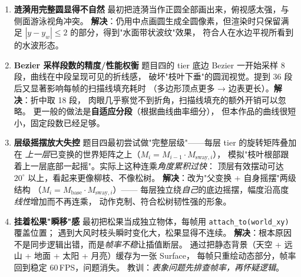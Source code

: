\documentclass[12pt, a4paper]{article}
\begin{document}
\begin{enumerate}[label=（\arabic*）, leftmargin=*]
    \item \textbf{涟漪用完整圆显得不自然}\quad
    最初把涟漪当作正圆全部画出来，俯视感太强，与侧面游泳视角冲突。
    \textbf{解决}：仍用中点画圆生成全圆像素，但渲染时只保留满足
    $|y - y_w| \le 2$ 的部分，得到"水面带状波纹"效果，
    符合人在水边平视所看到的水波形态。

    \item \textbf{Bezier 采样段数的精度/性能权衡}\quad
    题目四的 tier 底边 Bezier 一开始采样 8 段，曲线在中段呈现可见的折线感，
    破坏"枝叶下垂"的圆润视觉。提到 36 段后又显著影响每帧的扫描线填充耗时
    （多边形顶点更多 → 边表更长）。\textbf{解决}：折中取 18 段，
    肉眼几乎察觉不到折角，扫描线填充的额外开销可以忽略。
    更一般的做法是\textbf{自适应分段}（根据曲线曲率细分），
    但本作品的曲线很短小，固定段数已经足够。

    \item \textbf{层级摇摆放大失控}\quad
    题目四最初尝试做"完整层级"——每层 tier 的旋转矩阵叠加在
    \textit{上一层}已变换的世界矩阵之上（$M_i = M_{i-1} \cdot M_{\text{sway},i}$），
    模拟"枝叶根部跟着上一层底部一起摇"。实际上这种连乘\textit{角度累积过快}：
    顶层有效摆动可达 $20^\circ$ 以上，看起来更像柳枝、不像松树。
    \textbf{解决}：改为"父变换 + 自身摇摆"两级结构
    （$M_i = M_{\text{base}} \cdot M_{\text{sway},i}$）——
    每层独立绕\textit{自己}的底边摇摆，幅度沿高度\textit{线性}增加而不再连乘，
    动作克制、符合松树韧性强的形象。

    \item \textbf{挂着松果"瞬移"感}\quad
    最初把松果当成独立物体，每帧用 \texttt{attach\_to(world\_xy)} 覆盖位置；
    遇到大风时枝头瞬时变化大，松果显得不连续。
    \textbf{解决}：根本原因不是同步逻辑出错，而是\textit{帧率不稳}让插值断层。
    通过把静态背景（天空 + 远山 + 地面 + 太阳 + 月亮）缓存为一张 Surface，
    每帧只重绘动态部分，帧率回到稳定 60\,FPS，问题消失。
    教训：\textit{表象问题先排查帧率，再怀疑逻辑}。
\end{enumerate}
\end{document}
